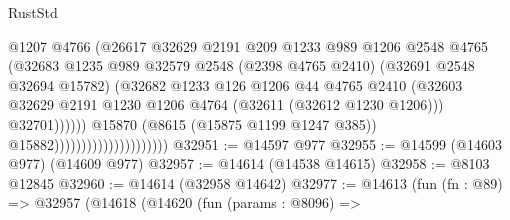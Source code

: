 \begin{lexlean}{RustStd}
\begin{coremodule}
                                                    @1207
                                                    @4766
                                                    (@26617
                                                      @32629
                                                      @2191
                                                      @209
                                                      @1233
                                                      @989
                                                      @1206
                                                      @2548
                                                      @4765
                                                      (@32683
                                                        @1235
                                                        @989
                                                        @32579
                                                        @2548
                                                        (@2398 @4765 @2410)
                                                        (@32691 @2548 @32694 @15782)
                                                        (@32682
                                                          @1233
                                                          @126
                                                          @1206
                                                          @44
                                                          @4765
                                                          @2410
                                                          (@32603
                                                            @32629
                                                            @2191
                                                            @1230
                                                            @1206
                                                            @4764
                                                            (@32611 (@32612 @1230 @1206)))
                                                          @32701))))))
                                              @15870
                                              (@8615 (@15875 @1199 @1247 @385))
                                              @15882)))))))))))))))))))))
@32951 := @14597 @977
@32955 := @14599 (@14603 @977) (@14609 @977)
@32957 := @14614 (@14538 @14615)
@32958 := @8103 @12845
@32960 := @14614 (@32958 @14642)
@32977 := @14613
    (fun (fn : @89) =>
    @32957
      (@14618
        (@14620
          (fun (params : @8096) =>

\end{coremodule}
\end{lexlean}
